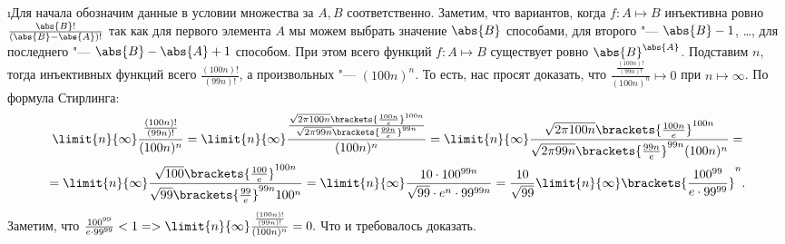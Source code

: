 \i Для начала обозначим данные в условии множества за $A, B$ соответственно. Заметим, что вариантов, когда $f: A \mapsto B$ инъективна ровно $\frac{\abs{B}!}{(\abs{B}-\abs{A})!}$ так как для первого элемента $A$ мы можем выбрать значение $\abs{B}$ способами, для второго "--- $\abs{B}-1$, \ldots, для последнего "--- $\abs{B} - \abs{A} + 1$ способом. При этом всего функций $f: A \mapsto B$ существует ровно $\abs{B}^{\abs{A}}$. Подставим $n$, тогда инъективных функций всего $\frac{(100n)!}{(99n)!}$, а произвольных "--- $(100n)^{n}$. То есть, нас просят доказать, что $\frac{\frac{(100n)!}{(99n)!}}{(100n)^{n}} \mapsto 0$ при $n \mapsto \infty$. По формула Стирлинга:
\begin{gather*}
    \limit{n}{\infty} \frac{\frac{(100n)!}{(99n)!}}{(100n)^{n}} = \limit{n}{\infty} \frac{\frac{\sqrt{2\pi 100n}\brackets{\frac{100n}{e}}^{100n}}{\sqrt{2\pi 99n}\brackets{\frac{99n}{e}}^{99n}}}{(100n)^n} = \limit{n}{\infty} \frac{\sqrt{2\pi 100n}\brackets{\frac{100n}{e}}^{100n}}{\sqrt{2\pi 99n}\brackets{\frac{99n}{e}}^{99n}(100n)^n} = \\
    = \limit{n}{\infty} \frac{\sqrt{100}\brackets{\frac{100}{e}}^{100n}}{\sqrt{99}\brackets{\frac{99}{e}}^{99n}100^n} = \limit{n}{\infty} \frac{10 \cdot 100^{99n}}{\sqrt{99}\cdot e^n \cdot 99^{99n}} = \frac{10}{\sqrt{99}} \limit{n}{\infty} \brackets{\frac{100^{99}}{e\cdot99^{99}}}^n.
\end{gather*}
Заметим, что $\frac{100^{99}}{e\cdot99^{99}} < 1 => \limit{n}{\infty} \frac{\frac{(100n)!}{(99n)!}}{(100n)^{n}} = 0.$ Что и требовалось доказать.
